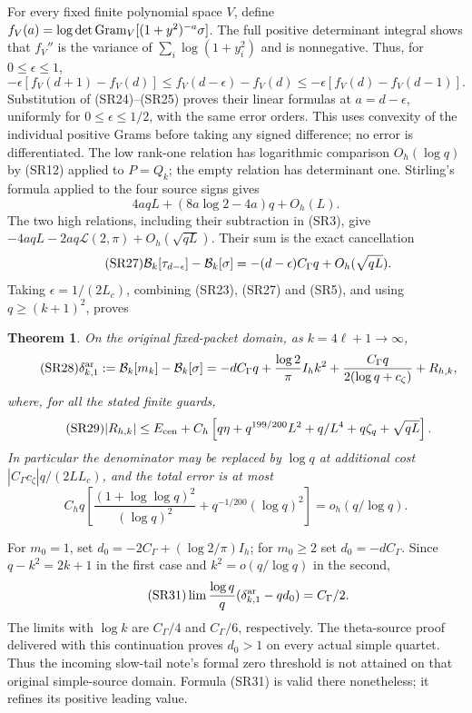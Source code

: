 \documentclass[11pt,a4paper]{article}
\newtheorem{theorem}{Theorem}[section]
\begin{document}
For every fixed finite polynomial space $V$, define
$f_V(a)=\log\det\operatorname{Gram}_V[(1+y^2)^{-a}\sigma]$.
The full positive determinant integral shows that $f_V''$ is the variance of
$\sum_i\log(1+y_i^2)$ and is nonnegative. Thus, for $0\le\epsilon\le1$,
\begin{equation}\tag{SR26}
 -\epsilon[f_V(d+1)-f_V(d)]
 \le f_V(d-\epsilon)-f_V(d)
 \le-\epsilon[f_V(d)-f_V(d-1)].
\end{equation}
Substitution of (SR24)--(SR25) proves their linear formulas at
$a=d-\epsilon$, uniformly for $0\le\epsilon\le1/2$, with the same error
orders. This uses convexity of the individual positive Grams before taking
any signed difference; no error is differentiated.
The low rank-one relation has logarithmic comparison $O_h(\log q)$ by
(SR12) applied to $P=Q_k$; the empty relation has determinant one.
Stirling's formula \cite{a02sr:DLMFGamma} applied to the four source signs gives
\[
 4aqL+(8a\log2-4a)q+O_h(L).
\]
The two high relations, including their subtraction in (SR3), give
$-4aqL-2aq\mathcal L(2,\pi)+O_h(\sqrt{qL})$.
Their sum is the exact cancellation
\begin{equation}\tag{SR27}
 \mathcal B_k[\tau_{d-\epsilon}]-\mathcal B_k[\sigma]
 =-(d-\epsilon)C_\Gamma q+O_h(\sqrt{qL}).
\end{equation}
Taking $\epsilon=1/(2L_c)$, combining (SR23), (SR27) and (SR5), and using
$q\ge(k+1)^2$, proves
\begin{theorem}
On the original fixed-packet domain, as $k=4\ell+1\to\infty$,
\begin{equation}\tag{SR28}
 \delta_{k,1}^{\rm ar}:=\mathcal B_k[m_k]-\mathcal B_k[\sigma]
 =-dC_\Gamma q+\frac{\log2}{\pi}I_hk^2
 +\frac{C_\Gamma q}{2(\log q+c_\zeta)}+R_{h,k},
\end{equation}
where, for all the stated finite guards,
\begin{equation}\tag{SR29}
 |R_{h,k}|\le E_{\rm cen}
 +C_h\left[q\eta+q^{199/200}L^2+q/L^4+q\zeta_q+\sqrt{qL}\right].
\end{equation}
In particular the denominator may be replaced by $\log q$ at additional
cost $|C_\Gamma c_\zeta|q/(2LL_c)$, and the total error is at most
\begin{equation}\tag{SR30}
 C_hq\left[\frac{(1+\log\log q)^2}{(\log q)^2}
                  +q^{-1/200}(\log q)^2\right]
 =o_h(q/\log q).
\end{equation}
\end{theorem}
For $m_0=1$, set $d_0=-2C_\Gamma+(\log2/\pi)I_h$; for $m_0\ge2$ set
$d_0=-dC_\Gamma$. Since $q-k^2=2k+1$ in the first case and
$k^2=o(q/\log q)$ in the second,
\begin{equation}\tag{SR31}
 \lim\frac{\log q}{q}(\delta_{k,1}^{\rm ar}-qd_0)=C_\Gamma/2.
\end{equation}
The limits with $\log k$ are $C_\Gamma/4$ and $C_\Gamma/6$, respectively.
The theta-source proof delivered with this continuation proves $d_0>1$ on
every actual simple quartet. Thus the incoming slow-tail note's formal zero
threshold is not attained on that original simple-source domain. Formula
(SR31) is valid there nonetheless; it refines its positive leading value.
\end{document}
